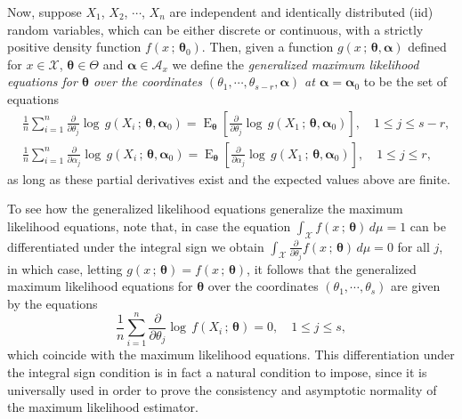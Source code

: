 \documentclass[lineno]{biometrika}
\newcommand{\bs}{\boldsymbol}
\newcommand{\on}{\operatorname}
\begin{document}
Now, suppose $X_1$, $X_2$, $\cdots$, $X_n$ are independent and identically distributed (iid) random variables, which can be either discrete or continuous, with a strictly positive density function  $f(x\,;\,\bs{\theta}_0)$. Then, given a function $g(x\,;\,\bs{\theta},\bs{\alpha})$ defined for $x\in \mathcal{X}$, $\bs{\theta}\in \Theta$ and $\bs{\alpha}\in \mathcal{A}_x$ we define the \textit{generalized maximum likelihood equations for $\bs{\theta}$ over the coordinates $(\theta_1,\cdots,\theta_{s-r},\bs{\alpha})$ at $\bs{\alpha}=\bs{\alpha}_0$} to be the set of equations
\begin{equation}\label{modified}
\begin{aligned}
&\frac{1}{n}\sum_{i=1}^n \frac{\partial}{\partial \theta_j}  \log\, g(X_i\,;\,\bs{\theta},\bs{\alpha}_0) = \on{E}_{\bs{\theta}}\left[\frac{\partial}{\partial \theta_j}  \log\, g(X_1\,;\,\bs{\theta},\bs{\alpha}_0)\right],\quad 1\leq j\leq s-r,\\ &\frac{1}{n}
\sum_{i=1}^n \frac{\partial}{\partial \alpha_j}  \log\, g(X_i\,;\,\bs{\theta},\bs{\alpha}_0)=\on{E}_{\bs{\theta}}\left[\frac{\partial}{\partial \alpha_j}  \log\, g(X_1\,;\,\bs{\theta},\bs{\alpha}_0)\right], \quad  1\leq j\leq r,
\end{aligned}
\end{equation}
as long as these partial derivatives exist and the expected values above are finite.

To see how the generalized likelihood equations generalize the maximum likelihood equations, note that, in case the equation $\int_{\mathcal{X}} f(x\,;\,\bs{\theta})\, d\mu =1$ can be differentiated under the integral sign we obtain $\int_{\mathcal{X}} \frac{\partial}{\partial \theta_j} f(x\,;\,\bs{\theta})\, d\mu =0$ for all $j$, in which case, letting $g(x\,;\,\bs{\theta})=f(x\,;\,\bs{\theta})$, it follows that the generalized maximum likelihood equations for $\bs{\theta}$ over the coordinates $(\theta_1,\cdots,\theta_s)$ are given by the equations
\begin{equation*}
\frac{1}{n}\sum_{i=1}^n \frac{\partial}{\partial \theta_j}  \log\, f(X_i\,;\,\bs{\theta}) = 0,\quad 1\leq j\leq s,
\end{equation*}
which coincide with the maximum likelihood equations. This differentiation under the integral sign condition is in fact a natural condition to impose, since it is universally used in order to prove the consistency and asymptotic normality of the maximum likelihood estimator.
\end{document}
